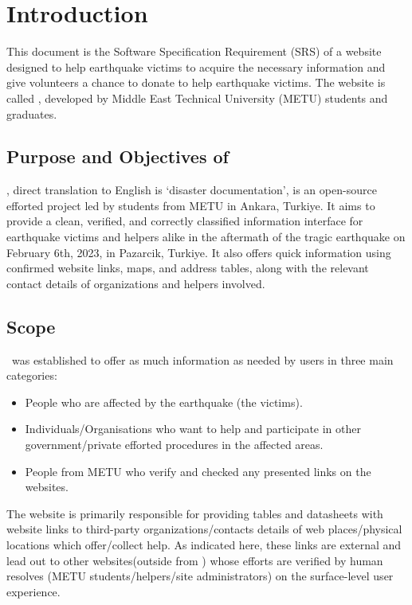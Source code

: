 \section{Introduction}

This document is the Software Specification Requirement (SRS) of a website designed to help earthquake victims to acquire the necessary information and give volunteers a chance to donate to help earthquake victims. The website is called \afetbilgi \cite{afetbilgi}, developed by Middle East Technical University (METU) students and graduates.

\subsection{Purpose and Objectives of \afetbilgi}

\afetbilgi, direct translation to English is `disaster documentation', is an open-source efforted project led by students from METU in Ankara, Turkiye. It aims to provide a clean, verified, and correctly classified information interface for earthquake victims and helpers alike in the aftermath of the tragic earthquake on February 6th, 2023, in Pazarcik, Turkiye. It also offers quick information using confirmed website links, maps, and address tables, along with the relevant contact details of organizations and helpers involved.

\subsection{Scope}

\afetbilgi\ was established to offer as much information as needed by users in three main categories:
\begin{itemize}
  \item People who are affected by the earthquake (the victims).
  \item Individuals/Organisations who want to help and participate in other government/private efforted procedures in the affected areas.
  \item People from METU who verify and checked any presented links on the websites.
\end{itemize}

The website is primarily responsible for providing tables and datasheets with website links to third-party organizations/contacts details of web places/physical locations which offer/collect help. As indicated here, these links are external and lead out to other websites(outside from \afetbilgi) whose efforts are verified by human resolves (METU students/helpers/site administrators) on the surface-level user experience.

